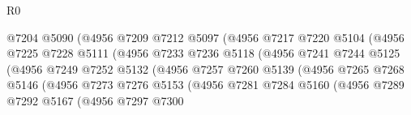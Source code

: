 \begin{lexlean}{R0}
\begin{coremodule}
                                    @7204
                                    @5090
                                    (@4956
                                      @7209
                                      @7212
                                      @5097
                                      (@4956
                                        @7217
                                        @7220
                                        @5104
                                        (@4956
                                          @7225
                                          @7228
                                          @5111
                                          (@4956
                                            @7233
                                            @7236
                                            @5118
                                            (@4956
                                              @7241
                                              @7244
                                              @5125
                                              (@4956
                                                @7249
                                                @7252
                                                @5132
                                                (@4956
                                                  @7257
                                                  @7260
                                                  @5139
                                                  (@4956
                                                    @7265
                                                    @7268
                                                    @5146
                                                    (@4956
                                                      @7273
                                                      @7276
                                                      @5153
                                                      (@4956
                                                        @7281
                                                        @7284
                                                        @5160
                                                        (@4956
                                                          @7289
                                                          @7292
                                                          @5167
                                                          (@4956
                                                            @7297
                                                            @7300

\end{coremodule}
\end{lexlean}
